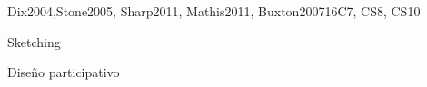 \begin{syllabus}
\begin{unit}{\HCIUsercentereddesignandtesting}{}{Dix2004,Stone2005, Sharp2011, Mathis2011, Buxton2007}{16}{C7, CS8, CS10}
\begin{topics}%
    \item \HCIUsercentereddesignandtestingTopicApproaches
    \item \HCIUsercentereddesignandtestingTopicFunctionality
    \item \HCIUsercentereddesignandtestingTopicTechniques
    \item \HCIUsercentereddesignandtestingTopicTechniquesAnd
    \item \HCIDesigningInteractionTopicTask
    \item \HCIDesignorientedHCITopicConsideration
    \begin{subtopics}
	\item Sketching
	\item Diseño participativo
    \end{subtopics}
    \item \HCIUsercentereddesignandtestingTopicPrototyping
    \item \HCIDesigningInteractionTopicLow
    \item \HCIDesigningInteractionTopicQuantitative
    \item \HCIUsercentereddesignandtestingTopicEvaluation
    \item \HCIUsercentereddesignandtestingTopicEvaluationWith
    \item \HCIUsercentereddesignandtestingTopicChallenges
    \item \HCIUsercentereddesignandtestingTopicReporting
    \item \HCIUsercentereddesignandtestingTopicInternationalization
\end{topics}
\begin{learningoutcomes}
	\item \HCIDesigningInteractionLOConduct[\Familiarity]
	\item \HCIDesigningInteractionLOForAn [\Familiarity]
	\item \HCIDesigningInteractionLODiscussAt [\Familiarity]
	\item \HCIUsercentereddesignandtestingLOExplainHowDesign [\Familiarity]
	\item \HCIUsercentereddesignandtestingLOUseLo [\Usage]
	\item \HCIUsercentereddesignandtestingLOChooseAppropriate [\Assessment]
	\item \HCIUsercentereddesignandtestingLOUseATechniques [\Assessment]
	\item \HCIUsercentereddesignandtestingLOCompareThe [\Assessment]
\end{learningoutcomes}
\end{unit}


\end{syllabus}
